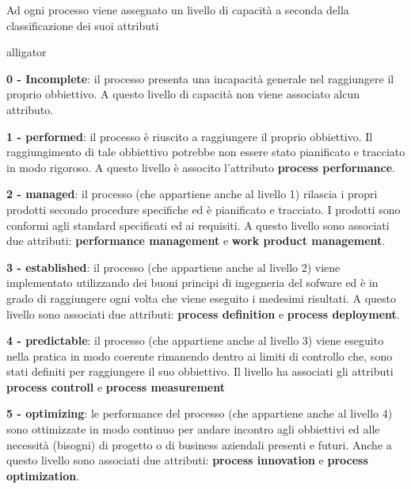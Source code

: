 Ad ogni processo viene assegnato un livello di capacità a seconda della classificazione dei suoi attributi
\begin{labeling}{alligator}
	\item \textbf{0 - Incomplete}: il processo presenta una incapacità generale nel raggiungere il proprio obbiettivo. A questo livello di capacità non viene associato alcun attributo.
	\item \textbf{1 - performed}: il processo è riuscito a raggiungere il proprio obbiettivo. Il raggiungimento di tale obbiettivo potrebbe non essere stato pianificato e tracciato in modo rigoroso. A questo livello è associto l'attributo \textbf{process performance}.
	\item \textbf{2 - managed}: il processo (che appartiene anche al livello 1) rilascia i propri prodotti secondo procedure specifiche ed è pianificato e tracciato. I prodotti sono conformi agli standard specificati ed ai requisiti. A questo livello sono associati due attributi: \textbf{performance management} e \textbf{work product management}.
	\item \textbf{3 - established}: il processo (che appartiene anche al livello 2) viene implementato utilizzando dei buoni principi di ingegneria del sofware ed è in grado di raggiungere ogni volta che viene eseguito i medesimi risultati. A questo livello sono associati due attributi: \textbf{process definition} e \textbf{process deployment}.
	\item \textbf{4 - predictable}: il processo (che appartiene anche al livello 3) viene eseguito nella pratica in modo coerente rimanendo dentro ai limiti di controllo che, sono stati definiti per raggiungere il suo obbiettivo. Il livello ha associati gli attributi \textbf{process controll} e \textbf{process measurement}
	\item \textbf{5 - optimizing}: le performance del processo (che appartiene anche al livello 4) sono ottimizzate in modo continuo per andare incontro agli obbiettivi ed alle necessità (bisogni) di progetto o di business aziendali presenti e futuri. %
	Anche a questo livello sono associati due attributi: \textbf{process innovation} e \textbf{process optimization}.
\end{labeling}

